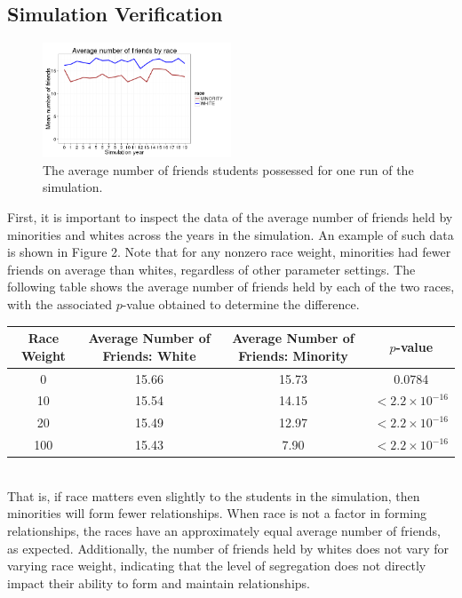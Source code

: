 \subsection{Simulation Verification}

\begin{figure}[h]
  \centering
    \includegraphics[width=0.5\textwidth]{avgNumberOfFriendsFromCaladan.png}
      \caption{The average number of friends students possessed for one run of the simulation.}
\end{figure}
First, it is important to inspect the data of the average number of friends held by minorities and whites across the years 
in the simulation. An example of such data is shown in Figure 2. Note that for any nonzero race weight, 
minorities had fewer friends on average than whites, regardless of other parameter settings. The following table shows the average 
number of friends held by each of the two races, with the associated $p$-value obtained to determine the difference.
\begin{center}
\begin{tabular}{|c|c|c|c|}
\hline
Race Weight & Average Number of Friends: White & Average Number of Friends: Minority & $p$-value\\
\hline
0 & 15.66 & 15.73 & 0.0784\\
10 & 15.54 & 14.15 & $<2.2\times 10^{-16}$\\
20 & 15.49 & 12.97 & $<2.2\times 10^{-16}$\\
100 & 15.43 & 7.90 & $<2.2\times 10^{-16}$\\
\hline
\end{tabular}
\end{center}~~\\

That is, if race matters even slightly to the students in the simulation, then minorities will form fewer relationships. When race is not a factor in 
forming relationships, the races have an approximately equal average number of friends, as expected. Additionally, the number of friends held by whites 
does not vary for varying race weight, indicating that the level of segregation does not directly impact their ability to form and maintain relationships.

